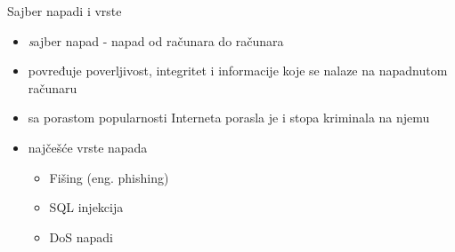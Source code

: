     \begin{frame}{Sajber napadi i vrste}
    \begin{itemize}
	\item \textit sajber napad - napad od računara do računara 
	\item povređuje poverljivost, integritet i informacije koje se nalaze na napadnutom računaru  
	\item sa porastom popularnosti Interneta porasla je i stopa kriminala na njemu
	\item najčešće vrste napada
	\begin{itemize}
	\item Fišing (eng. phishing)
	\item SQL injekcija
	\item DoS napadi
\end{itemize}	  
    \end{itemize}
    \end{frame}
    
    
